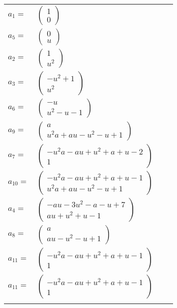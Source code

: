 \documentclass[1p]{elsarticle_modified}
\theoremstyle{definition}
\begin{document}
\begin{tabular}{m{7pt} m{180pt} m{7pt} m{180pt} }
\flushright $a_{1}=$&$\begin{pmatrix}1\\0\end{pmatrix}$ \\
\flushright $a_{5}=$&$\begin{pmatrix}0\\u\end{pmatrix}$ \\
\flushright $a_{2}=$&$\begin{pmatrix}1\\u^2\end{pmatrix}$ \\
\flushright $a_{3}=$&$\begin{pmatrix}- u^2+1\\u^2\end{pmatrix}$ \\
\flushright $a_{6}=$&$\begin{pmatrix}- u\\u^2- u-1\end{pmatrix}$ \\
\flushright $a_{9}=$&$\begin{pmatrix}a\\u^2 a+a u- u^2- u+1\end{pmatrix}$ \\
\flushright $a_{7}=$&$\begin{pmatrix}- u^2 a- a u+u^2+a+u-2\\1\end{pmatrix}$ \\
\flushright $a_{10}=$&$\begin{pmatrix}- u^2 a- a u+u^2+a+u-1\\u^2 a+a u- u^2- u+1\end{pmatrix}$ \\
\flushright $a_{4}=$&$\begin{pmatrix}- a u-3 u^2- a- u+7\\a u+u^2+u-1\end{pmatrix}$ \\
\flushright $a_{8}=$&$\begin{pmatrix}a\\a u- u^2- u+1\end{pmatrix}$ \\
\flushright $a_{11}=$&$\begin{pmatrix}- u^2 a- a u+u^2+a+u-1\\1\end{pmatrix}$\\ \flushright $a_{11}=$&$\begin{pmatrix}- u^2 a- a u+u^2+a+u-1\\1\end{pmatrix}$\\&\end{tabular}
\end{document}

